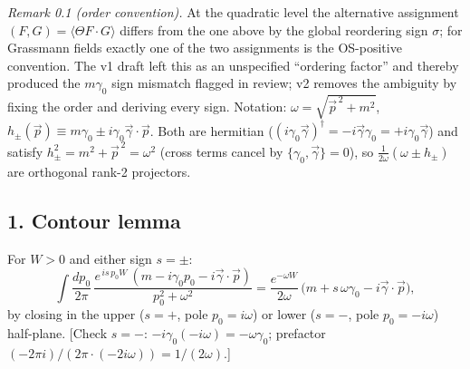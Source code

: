 \emph{Remark 0.1 (order convention).}
At the quadratic level the alternative assignment
$(F,G)=\langle\Theta F\cdot G\rangle$ differs from the one above by
the global reordering sign $\sigma$; for Grassmann fields exactly
one of the two assignments is the OS-positive convention.
The v1 draft left this as an unspecified ``ordering factor'' and
thereby produced the $m\gamma_0$ sign mismatch flagged in review;
v2 removes the ambiguity by fixing the order and deriving every
sign.
Notation: $\omega=\sqrt{\vec p^{\,2}+m^2}$,
$h_\pm(\vec p)\equiv m\gamma_0\pm i\gamma_0\vec\gamma\cdot\vec p$.
Both are hermitian
($(i\gamma_0\vec\gamma)^\dagger=-i\vec\gamma\gamma_0
=+i\gamma_0\vec\gamma$) and satisfy
$h_\pm^2=m^2+\vec p^{\,2}=\omega^2$
(cross terms cancel by $\{\gamma_0,\vec\gamma\}=0$),
so $\tfrac{1}{2\omega}(\omega\pm h_\pm)$ are orthogonal rank-2
projectors.

\subsection*{1. Contour lemma}
For $W>0$ and either sign $s=\pm$:
\[
\int\frac{dp_0}{2\pi}\,
\frac{e^{\,is\,p_0W}\,(m-i\gamma_0p_0-i\vec\gamma\cdot\vec p)}
{p_0^2+\omega^2}
=\frac{e^{-\omega W}}{2\omega}\,
\bigl(m+s\,\omega\gamma_0-i\vec\gamma\cdot\vec p\bigr),
\]
by closing in the upper ($s=+$, pole $p_0=i\omega$) or lower
($s=-$, pole $p_0=-i\omega$) half-plane.
[Check $s=-$: $-i\gamma_0(-i\omega)=-\omega\gamma_0$; prefactor
$(-2\pi i)/(2\pi\cdot(-2i\omega))=1/(2\omega)$.]


